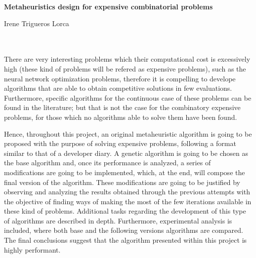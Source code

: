 \cleardoublepage


\thispagestyle{empty}


\begin{center}
{\large\bfseries Metaheuristics design for expensive combinatorial problems }\\
\end{center}
\begin{center}
Irene Trigueros Lorca\\
\end{center}

\\

\vspace{0.7cm}
\\

There are very interesting problems which their computational cost is excessively high (these kind of problems will be refered as expensive problems), such as the neural network optimization problems, therefore it is compelling to develope algorithms that are able to obtain competitive solutions in few evaluations. 
Furthermore, specific algorithms for the continuous case of these problems can be found in the literature; but that is not the case for the combinatory expensive problems, for those which no algorithms able to solve them have been found.

Hence, throughout this project, an original metaheuristic algorithm is going to be proposed with the purpose of solving expensive problems, following a format similar to that of a developer diary. 
A genetic algorithm is going to be chosen as the base algorithm and, once its performance is analyzed, a series of modifications are going  to be implemented, which, at the end, will compose the final version of the algorithm. 
These modifications are going to be justified by observing and analyzing the results obtained through the previous attempts with the objective of finding ways of making the most of the few iterations available in these kind of problems. 
Additional tasks regarding the development of this type of algorithms are described in depth. 
Furthermore, experimental analysis is included, where both base and the following versions algorithms are compared. 
The final conclusions suggest that the algorithm presented within this project is highly performant.

